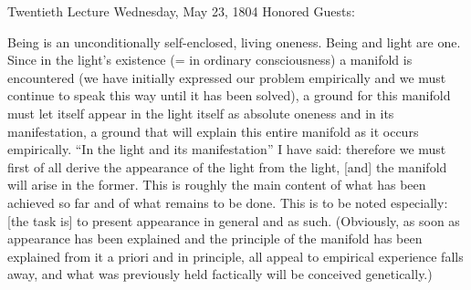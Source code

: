 Twentieth Lecture
Wednesday, May 23, 1804
Honored Guests:

Being is an unconditionally
self-enclosed, living oneness.
Being and light are one.
Since in the light's existence
(= in ordinary consciousness)
a manifold is encountered
(we have initially expressed our problem empirically
and we must continue to speak this way until it has been solved),
a ground for this manifold must let itself appear
in the light itself as absolute oneness
and in its manifestation,
a ground that will explain this entire manifold
as it occurs empirically.
“In the light and its manifestation”
I have said:
therefore we must first of all derive
the appearance of the light from the light,
[and] the manifold will arise in the former.
This is roughly the main content of
what has been achieved so far and of
what remains to be done.
This is to be noted especially:
[the task is] to present appearance in general and as such.
(Obviously, as soon as appearance has been explained
and the principle of the manifold has been explained
from it a priori and in principle,
all appeal to empirical experience falls away,
and what was previously held factically
will be conceived genetically.)

